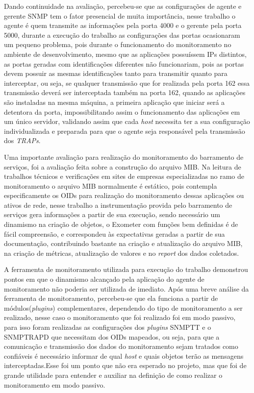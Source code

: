 Dando continuidade na avaliação, percebeu-se que as configurações de agente e gerente \acrshort{SNMP} tem o fator presencial de muita importância, nesse trabalho o agente é quem transmite as informações pela porta 4000 e o gerente pela porta 5000, durante a execução do trabalho as configurações das portas ocasionaram um pequeno problema, pois durante o funcionamento do monitoramento no ambiente de desenvolvimento, mesmo que as aplicações possuíssem \acrshort{IP}s distintos, as portas geradas com identificações diferentes não funcionariam, pois as portas devem possuir as mesmas identificações tanto para transmitir quanto para interceptar, ou seja, se qualquer transmissão que for realizada pela porta 162 essa transmissão deverá ser interceptada também na porta 162, quando as aplicações são instaladas na mesma máquina, a primeira aplicação que iniciar será a detentora da porta, impossibilitando assim o funcionamento das aplicações em um único servidor, validando assim que cada \textit{host} necessita ter a sua configuração individualizada e preparada para que o agente seja responsável pela transmissão dos \textit{TRAPs}. 

Uma importante avaliação para realização do monitoramento do barramento de serviços, foi a avaliação feita sobre a construção do arquivo MIB. Na leitura de trabalhos técnicos e verificações em sites de empresas especializadas no ramo de monitoramento o arquivo MIB normalmente é estático, pois contempla especificamente os \acrshort{OID}s para realização do monitoramento dessas aplicações ou ativos de rede, nesse trabalho a instrumentação provida pelo barramento de serviços gera informações a partir de sua execução, sendo necessário um dinamismo na criação de objetos, o Exometer com funções bem definidas é de fácil compreensão, e correspondeu às expectativas geradas a partir de sua documentação, contribuindo bastante na criação e atualização do arquivo MIB, na criação de métricas, atualização de valores e no \textit{report} dos dados coletados.  

A ferramenta de monitoramento utilizada para execução do trabalho demonstrou pontos em que o dinamismo alcançado pela aplicação do agente de monitoramento não poderia ser utilizada de imediato. Após uma breve análise da ferramenta de monitoramento, percebeu-se que ela funciona a partir de módulos(\textit{plugins}) complementares, dependendo do tipo de monitoramento a ser realizado, nesse caso o monitoramento que foi realizado foi em modo passivo, para isso foram realizadas as configurações dos \textit{plugins} \acrshort{SNMPTT} e o SNMPTRAPD que necessitam dos \acrshort{OID}s mapeados, ou seja, para que a comunicação e transmissão dos dados do monitoramento sejam tratados como confiáveis é necessário informar de qual \textit{host} e quais objetos terão as mensagens interceptadas.Esse foi um ponto que não era esperado no projeto, mas que foi de grande utilidade para entender e auxiliar na definição de como realizar o monitoramento em modo passivo.   

